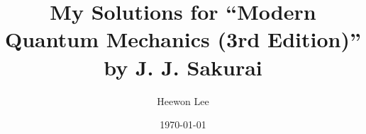 
\setcounter{section}{-1}

\title{My Solutions for ``Modern Quantum Mechanics (3rd Edition)'' by J. J. Sakurai}
\author{Heewon Lee}
\date{\today}



\maketitle






